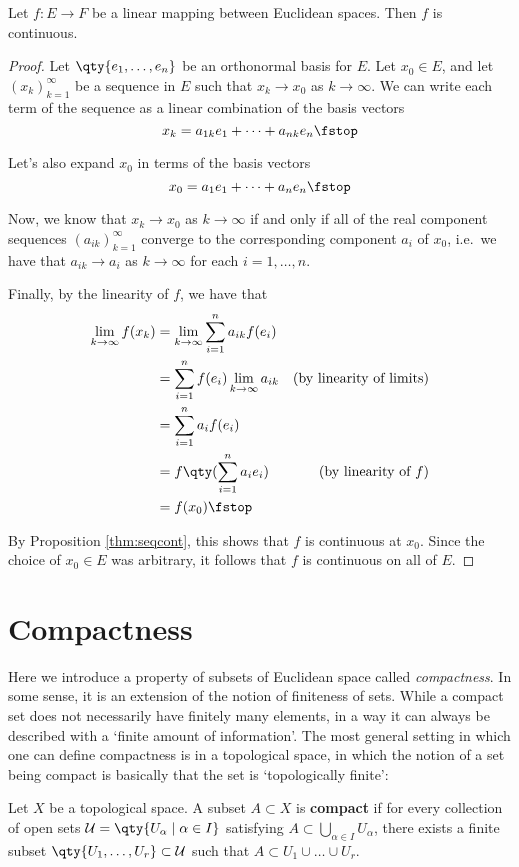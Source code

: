  \begin{theorem}
   \label{thm:lin-cont}
   Let \( f:E\to F \) be a linear mapping between Euclidean spaces. Then \( f \) is continuous.
 \end{theorem}
 \begin{proof}
   Let \( \qty{e_1,\dots, e_n} \) be an orthonormal basis for \( E \). Let \( x_0\in E \), and let \( (x_k)_{k=1}^\infty \) be a sequence in \( E \) such that \( x_k\to x_0 \) as \( k\to\infty \). We can write each term of the sequence as a linear combination of the basis vectors
   \[ x_k=a_{1k}e_1+\dots+a_{nk}e_n\fstop \]

   Let's also expand \( x_0 \) in terms of the basis vectors
   \[ x_0=a_1e_1+\dots+a_ne_n\fstop \]

   Now, we know that \( x_k\to x_0 \) as \( k\to\infty \) if and only if all of the real component sequences \( (a_{ik})_{k=1}^\infty \) converge to the corresponding component \( a_i \) of \( x_0 \), i.e.\ we have that \( a_{ik}\to a_i \) as \( k\to\infty \) for each \( i=1,\dots,n \).

   \vspace{3mm}

   Finally, by the linearity of \( f \), we have that
   \begin{align*}
     \lim_{k\to\infty}f(x_k)&= \lim_{k\to\infty}\sum_{i=1}^n a_{ik}f(e_i)\\
     &= \sum_{i=1}^n f(e_i)\lim_{k\to\infty} a_{ik} &(\text{by linearity of limits})\\
     &= \sum_{i=1}^n a_i f(e_i)\\
     &= f\qty(\sum_{i=1}^n a_ie_i) &(\text{by linearity of }f)\\
     &= f(x_0)\fstop
   \end{align*}

   By Proposition \ref{thm:seqcont}, this shows that \( f \) is continuous at \( x_0 \). Since the choice of \( x_0\in E \) was arbitrary, it follows that \( f \) is continuous on all of \( E \).
 \end{proof}

 \section{Compactness}
 Here we introduce a property of subsets of Euclidean space called \emph{compactness}. In some sense, it is an extension of the notion of finiteness of sets. While a compact set does not necessarily have finitely many elements, in a way it can always be described with a `finite amount of information'. The most general setting in which one can define compactness is in a topological space, in which the notion of a set being compact is basically that the set is `topologically finite':
 \begin{definition}
   Let \( X \) be a topological space. A subset \( A\subset X \) is \textbf{compact} if for every collection of open sets \( \mathcal{U}=\qty{U_\alpha\mid \alpha\in I} \) satisfying \( A\subset\bigcup_{\alpha\in I}U_\alpha \), there exists a finite subset \( \qty{U_1,\dots,U_r}\subset\mathcal{U} \) such that \( A\subset U_1\cup\dots\cup U_r \).
 \end{definition}

